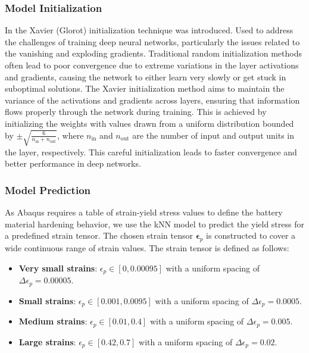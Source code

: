 \subsubsection{Model Initialization}
In \citet{glorot2010} the Xavier (Glorot) initialization technique was introduced. Used to address the challenges of training deep neural networks, particularly the issues related to the vanishing and exploding gradients. Traditional random initialization methods often lead to poor convergence due to extreme variations in the layer activations and gradients, causing the network to either learn very slowly or get stuck in suboptimal solutions. The Xavier initialization method aims to maintain the variance of the activations and gradients across layers, ensuring that information flows properly through the network during training. This is achieved by initializing the weights with values drawn from a uniform distribution bounded by \(\pm \sqrt{\frac{6}{n_{\text{in}} + n_{\text{out}}}}\), where \(n_{\text{in}}\) and \(n_{\text{out}}\) are the number of input and output units in the layer, respectively. This careful initialization leads to faster convergence and better performance in deep networks.



\subsubsection{Model Prediction}

As Abaqus requires a table of strain-yield stress values to define the battery material hardening behavior, we use the kNN model to predict the yield stress for a predefined strain tensor. The chosen strain tensor \(\boldsymbol{\epsilon}_p\) is constructed to cover a wide continuous range of strain values. The strain tensor is defined as follows:

\begin{itemize}
    \item \textbf{Very small strains}: \( \epsilon_p \in [0, 0.00095] \) with a uniform spacing of \( \Delta \epsilon_p = 0.00005 \).
    \item \textbf{Small strains}: \( \epsilon_p \in [0.001, 0.0095] \) with a uniform spacing of \( \Delta \epsilon_p = 0.0005 \).
    \item \textbf{Medium strains}: \( \epsilon_p \in [0.01, 0.4] \) with a uniform spacing of \( \Delta \epsilon_p = 0.005 \).
    \item \textbf{Large strains}: \( \epsilon_p \in [0.42, 0.7] \) with a uniform spacing of \( \Delta \epsilon_p = 0.02 \).
\end{itemize}

